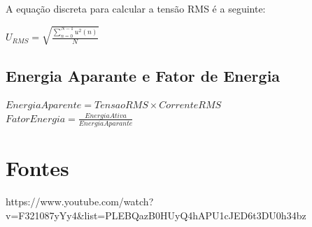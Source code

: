 \documentclass[a4paper, 12pt]{article}
\begin{document}
A equação discreta para calcular a tensão RMS é a seguinte:
\begin{center}
	$U_{RMS} = \sqrt{\frac{\sum_{n = 0}^{N-1} u^{2}(n)}{N}}$
\end{center}

\subsection{Energia Aparante e Fator de Energia}
\begin{center}
	$
	EnergiaAparente = TensaoRMS \times CorrenteRMS
	$\\
	$
	FatorEnergia = \frac{EnergiaAtiva}{EnergiaAparante}
	$
\end{center}











\newpage
\section{Fontes}
https://www.youtube.com/watch?v=F321087yYy4\&list=PLEBQazB0HUyQ4hAPU1cJED6t3DU0h34bz
\end{document}
